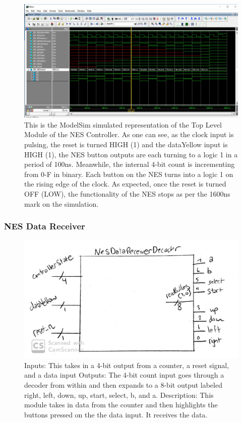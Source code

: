 \documentclass[a4paper]{article}
\begin{document}
\begin{figure}[H]
  \centering
    \includegraphics[width=.85\textwidth]{images/ModelSim/nesreader.JPG}
	\caption{This is the ModelSim simulated representation of the Top Level Module of the NES Controller. As one can see, as the clock input is pulsing, the reset is turned HIGH (1) and the dataYellow input is HIGH (1), the NES button outputs are each turning to a logic 1 in a period of 100ns. Meanwhile, the internal 4-bit count is incrementing from 0-F in binary. Each button on the NES turns into a logic 1 on the rising edge of the clock. As expected, once the reset is turned OFF (LOW), the functionality of the NES stops as per the 1600ns mark on the simulation.}
    \label{fig:top_level_block_sim}
\end{figure}

\subsubsection{NES Data Receiver}

\begin{figure}[H]
  \centering
    \includegraphics[width=.85\textwidth]{images/block_diagrams/nes/datareceiver2.jpg}
	\caption{Inputs: This takes in a 4-bit output from a counter, a reset signal, and a data input \newline
Outputs: The 4-bit count input goes through a decoder from within and then expands to a 8-bit output labeled right, left, down, up, start, select, b, and a. \newline
Description: This module takes in data from the counter and then highlights the buttons pressed on the the data input. It receives the data.} 
    \label{fig:data_receiver}
\end{figure}
\end{document}
